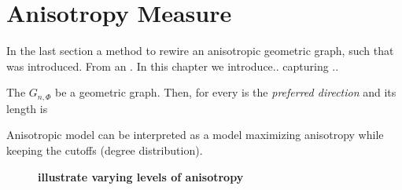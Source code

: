 


\newpage

\section{Anisotropy Measure}\label{sec:anisotropy_measure}

In the last section a method to rewire an anisotropic geometric graph,
such that was introduced. From an . In this chapter we
introduce.. capturing ..

The $G_{n, \Phi}$ be a geometric graph. Then, for every is the
\textit{preferred direction} and its length is 

\textcite{Mardia_Directional-statistics}


Anisotropic model can be interpreted as a model maximizing anisotropy
while keeping the cutoffs (degree distribution).


 
\begin{figure}[H]
\caption{\textbf{illustrate varying levels of anisotropy}}
\end{figure}


